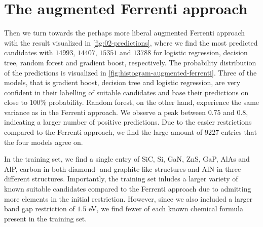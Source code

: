 \begin{comment}
\begin{table}[!ht]
\centering
\caption{Table of the number of predictions made with the optimal model for the insightful approach. }
\label{tab:timing-extraction}
\noindent\makebox[\textwidth]{
\begin{tabular}{M{3.0cm} M{4.0cm} M{4.0cm}}
  \hline
  \hline
   Model & Optimal number PC & Number of predictions \\
  \hline
  Logistic regression & $145$  & $454$ \\
  Decision trees      &  $3$   & $442$ \\
  Random forest       &  $10 $ & $325$ \\
  Gradient boost      &  $7$   & $699$ \\
  \hline
  \hline
\end{tabular}
}
\end{table}
\end{comment}


\section{The augmented Ferrenti approach}
Then we turn towards the perhaps more liberal augmented Ferrenti approach with the result visualized in \autoref{fig:02-predictions}, where we find the most predicted candidates with $14993$, $14407$, $15351$ and $13788$ for logistic regression, decision tree, random forest and gradient boost, respectively. The probability distribution of the predictions is visualized in \autoref{fig:histogram-augmented-ferrenti}. Three of the models, that is gradient boost, decision tree and logistic regression, are very confident in their labelling of suitable candidates and base their predictions on close to $100\%$ probability. Random forest, on the other hand, experience the same variance as in the Ferrenti approach. We observe a peak between $0.75$ and $0.8$, indicating a larger number of positive predictions. Due to the easier restrictions compared to the Ferrenti approach, we find the large amount of $9227$ entries that the four models agree on.



\noindent In the training set, we find a single entry of SiC, Si, GaN, ZnS, GaP, AlAs and AlP, carbon in both diamond- and graphite-like structures and AlN in three different structures. Importantly, the training set inludes a larger variety of known suitable candidates compared to the Ferrenti approach due to admitting more elements in the initial restriction. However, since we also included a larger band gap restriction of $1.5$ eV, we find fewer of each known chemical formula present in the training set.

